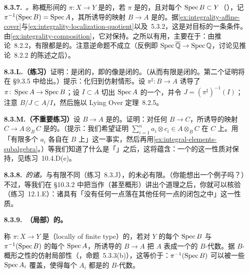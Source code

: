 \textbf{8.3.7.}\ \emph{\trhDefinition{}。}\quad 称概形间的\trMorphism{} $\pi\colon X\to Y$ 是\textbf{\trIntegral}的，若 $\pi$ 是\trAffine{}的，且对每个 $\operatorname{Spec} B\subset Y$（\trAffine\trOpenSubset），记 $\pi^{-1}(\operatorname{Spec} B)=\operatorname{Spec} A$，其所诱导的映射 $B\to A$ 是\trIntegral{}的\trRingMorphism。据\cref{ex:integrality-affine-cover}与\cref{ex:integrality-localization-quotient}以及\trAffineCommunicationLemma{}~5.3.2，这是对目标\trAffineLocal{}的一条条件。由\cref{ex:integrality-composition}，它对\trComposition{}保持。\trIntegral{}\trMorphism{}之所以有用，主要在于：由推论~8.2.2，有限\trMorphism{}都是\trIntegral{}的。注意逆命题不成立（反例即 $\operatorname{Spec}\overline{\mathbb{Q}}\to\operatorname{Spec}\mathbb{Q}$，讨论见推论~8.2.2 的陈述之后）。

\textbf{8.3.L.（练习）}\quad 证明：\trIntegral{}\trMorphism{}是闭的，即\trClosedSubset{}的像是闭的。（从而有限\trMorphism{}是闭的。第二个证明将在 \S9.3.5 中给出。）提示：化归到仿射情形。设\trRingMorphism{} $\pi^\sharp\colon B\to A$ 诱导了\trIntegral{}\trMorphism{} $\pi\colon\operatorname{Spec} A\to\operatorname{Spec} B$；设 $I\subset A$ 切出 $\operatorname{Spec} A$ 的一个\trClosedSet，并令 $J=(\pi^\sharp)^{-1}(I)$；注意 $B/J\subset A/I$，然后施以 Lying Over 定理~8.2.5。

\textbf{8.3.M.（不重要练习）}\quad 设 $B\to A$ 是\trIntegral{}的。证明：对任何\trRingMorphism{} $B\to C$，所诱导的映射 $C\to A\otimes_B C$ 是\trIntegral{}的。（提示：我们希望证明 $\sum_{i=1}^n a_i\otimes c_i\in A\otimes_B C$ 在 $C$ 上\trIntegral。用「有限多个 $a_i$ 各自在 $B$ 上\trIntegral」这一事实，然后再用\cref{ex:integral-elements-subalgebra}。）等我们知道了什么是「\trBaseChange」之后，这将蕴含：一个\trMorphism{}的\trIntegrality{}这一性质对\trBaseChange{}保持，见\mbox{练习~10.4.D(e)}。

\textbf{8.3.8.}\ \emph{\trIntegral{}\trMorphism{}的诸\trFiber。}\quad 与有限\trMorphism{}不同（练习~8.3.J），\trIntegral{}\trMorphism{}的\trFiber{}未必有限。（你能想出一个例子吗？）不过，等我们在 \S10.3.2 中把\trFiber{}当作\trTopologicalSpace（甚至概形）讲出个道理之后，你就可以核验（\mbox{练习~12.1.E}）：诸\trFiber{}具有「没有任何一点落在其他任何一点的闭包之中」这一性质。

\textbf{8.3.9.\ （局部）\trFiniteType{}的\trMorphism。}

称\trMorphism{} $\pi\colon X\to Y$ 是\textbf{\trLocally\trFiniteType}（locally of finite type）的，若对 $Y$ 的每个\trAffine\trOpenSet{} $\operatorname{Spec} B$ 与 $\pi^{-1}(\operatorname{Spec} B)$ 的每个\trAffine\trOpenSubset{} $\operatorname{Spec} A$，所诱导的\trMorphism{} $B\to A$ 把 $A$ 表成一个\trFinitelyGenerated{}的 $B$-代数。据 $B$-概形之\trFiniteType{}性的仿射局部性（\trAffineLocal，命题~5.3.3(b)），这等价于：$\pi^{-1}(\operatorname{Spec} B)$ 可以被一些\trAffine\trOpenSubset{} $\operatorname{Spec} A_i$ 覆盖，使得每个 $A_i$ 都是\trFinitelyGenerated{}的 $B$-代数。

